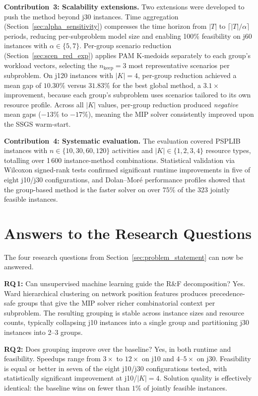 \textbf{Contribution~3: Scalability extensions.}
Two extensions were developed to push the method beyond j30
instances. Time aggregation
(Section~\ref{sec:alpha_sensitivity}) compresses the time
horizon from $|T|$ to $\lceil |T|/\alpha \rceil$ periods,
reducing per-subproblem model size and enabling 100\%
feasibility on j60 instances with $\alpha \in \{5, 7\}$.
Per-group scenario reduction
(Section~\ref{sec:scen_red_exp}) applies PAM K-medoids
separately to each group's workload vectors, selecting the
$n_{\mathrm{keep}} = 3$ most representative scenarios per
subproblem. On j120 instances with $|K|=4$, per-group
reduction achieved a mean gap of $10.30\%$ versus $31.83\%$
for the best global method, a $3.1\times$ improvement, because
each group's subproblem uses scenarios tailored to its own
resource profile. Across all $|K|$ values, per-group reduction
produced \emph{negative} mean gaps ($-13\%$ to $-17\%$),
meaning the MIP solver consistently improved upon the SSGS
warm-start.

\textbf{Contribution~4: Systematic evaluation.}
The evaluation covered PSPLIB instances with
$n \in \{10, 30, 60, 120\}$ activities and
$|K| \in \{1, 2, 3, 4\}$ resource types, totalling over
1\,600 instance-method combinations. Statistical validation
via Wilcoxon signed-rank tests confirmed significant runtime
improvements in five of eight j10/j30 configurations, and
Dolan--Mor\'e performance profiles showed that the group-based
method is the faster solver on over $75\%$ of the 323 jointly
feasible instances.

\section{Answers to the Research Questions}
\label{sec:conclusion_rq}
The four research questions from
Section~\ref{sec:problem_statement} can now be answered.

\textbf{RQ\,1:} Can unsupervised machine learning guide the
R\&F decomposition? Yes. Ward hierarchical clustering on
network position features produces precedence-safe groups that
give the MIP solver richer combinatorial context per
subproblem. The resulting grouping is stable across instance
sizes and resource counts, typically collapsing j10 instances
into a single group and partitioning j30 instances into
2--3 groups.

\textbf{RQ\,2:} Does grouping improve over the baseline?
Yes, in both runtime and feasibility. Speedups range from
$3\times$ to $12\times$ on j10 and $4$--$5\times$ on j30.
Feasibility is equal or better in seven of the eight
j10/j30 configurations tested, with statistically significant
improvement at j10/$|K|=4$. Solution quality is effectively
identical: the baseline wins on fewer than $1\%$ of jointly
feasible instances.

